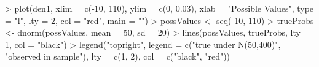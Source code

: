 \begin{Schunk}
\begin{Sinput}
> plot(den1, xlim = c(-10, 110), ylim = c(0, 0.03), 
      xlab = "Possible Values", type = "l", lty = 2, 
      col = "red", main = "")
> possValues <- seq(-10, 110)
> trueProbs <- dnorm(possValues, mean = 50, sd = 20)
> lines(possValues, trueProbs, lty = 1, col = "black")
> legend("topright", legend = c("true under N(50,400)", 
      "observed in sample"), lty = c(1, 2), col = c("black", 
      "red"))
\end{Sinput}
\end{Schunk}
